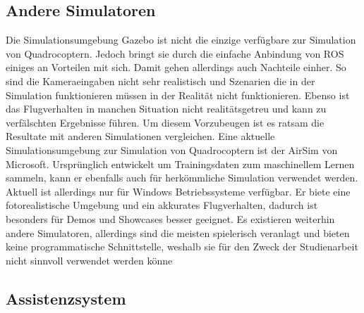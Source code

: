 \subsection{Andere Simulatoren}
Die Simulationsumgebung Gazebo ist nicht die einzige verfügbare zur Simulation von Quadrocoptern. Jedoch bringt sie durch die einfache Anbindung von ROS einiges an Vorteilen mit sich. Damit gehen allerdings auch Nachteile einher. So sind die Kameraeingaben nicht sehr realistisch und Szenarien die in der Simulation funktionieren müssen in der Realität nicht funktionieren. Ebenso ist das Flugverhalten in manchen Situation nicht realitätsgetreu und kann zu verfälschten Ergebnisse führen. Um diesem Vorzubeugen ist es ratsam die Resultate mit anderen Simulationen vergleichen. Eine aktuelle Simulationsumgebung zur Simulation von Quadrocoptern ist der AirSim von Microsoft.\cite{airsim} Ursprünglich entwickelt um Trainingsdaten zum maschinellem Lernen sammeln, kann er ebenfalls auch für herkömmliche Simulation verwendet werden. Aktuell ist allerdings nur für Windows Betriebssysteme verfügbar. \cite{airsimpaper} Er biete eine fotorealistische Umgebung und ein akkurates Flugverhalten, dadurch ist besonders für Demos und Showcases besser geeignet. \newline
Es existieren weiterhin andere Simulatoren, allerdings sind die meisten spielerisch veranlagt und bieten keine programmatische Schnittstelle, weshalb sie für den Zweck der Studienarbeit nicht sinnvoll verwendet werden könne



\subsection{Assistenzsystem}
